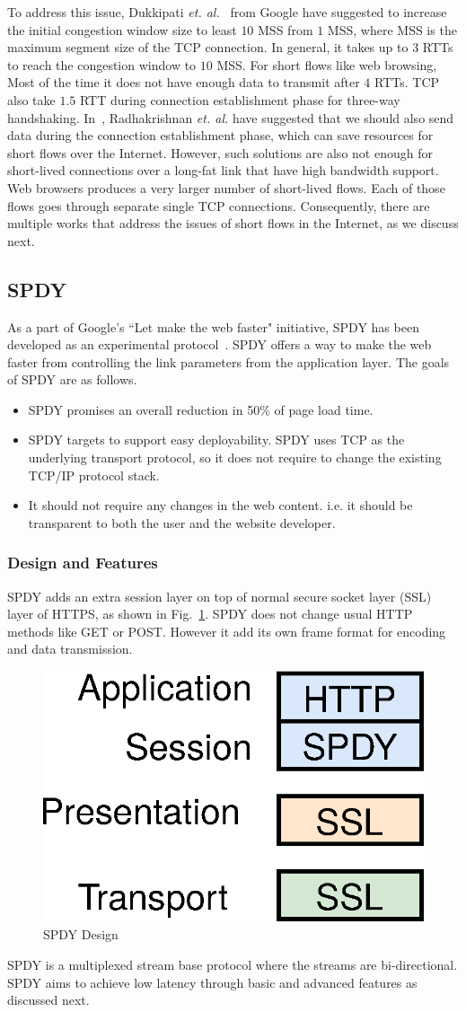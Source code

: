 To address this issue, Dukkipati \textit{et. al.}~\cite{google-long-initcwnd} from Google have suggested to increase the initial congestion window size to least $10$ MSS from $1$ MSS, where MSS is the maximum segment size of the TCP connection. In general, it takes up to $3$ RTTs to reach the congestion window to $10$ MSS. For short flows like web browsing, Most of the time it does not have enough data to transmit after $4$ RTTs. TCP also take $1.5$ RTT during connection establishment phase for three-way handshaking. In~\cite{google-fast-open}, Radhakrishnan \textit{et. al.} have suggested that we should also send data during the connection establishment phase, which can save resources for short flows over the Internet. However, such solutions are also not enough for short-lived connections over a long-fat link that have high bandwidth support. Web browsers produces a very larger number of short-lived flows. Each of those flows goes through separate single TCP connections. Consequently, there are multiple works that address the issues of short flows in the Internet, as we discuss next.

\subsection{SPDY}
As a part of Google's ``Let make the web faster" initiative, SPDY has been developed as an experimental protocol~\cite{spdy}. SPDY offers a way to make the web faster from controlling the link parameters from the application layer. The goals of SPDY are as follows.
\begin{itemize}
    \item SPDY promises an overall reduction in 50\% of page load time.
    \item SPDY targets to support easy deployability. SPDY uses TCP as the underlying transport protocol, so it does not require to change the existing TCP/IP protocol stack.
    \item It should not require any changes in the web content. i.e. it should be transparent to both the user and the website developer.
\end{itemize}

\subsubsection{Design and Features}
SPDY adds an extra session layer on top of normal secure socket layer (SSL) layer of HTTPS, as shown in Fig.~\ref{fig:spdy.design}. SPDY does not change usual HTTP methods like GET or POST. However it add its own frame format for encoding and data transmission. 
\begin{figure}[!ht]
    \centering
    \includegraphics[width=0.2\linewidth]{img/spdy/spdy_design}
    \caption{SPDY Design}
    \label{fig:spdy.design}
\end{figure}
SPDY is a multiplexed stream base protocol where the streams are bi-directional. SPDY aims to achieve low latency through basic and advanced features as discussed next.

